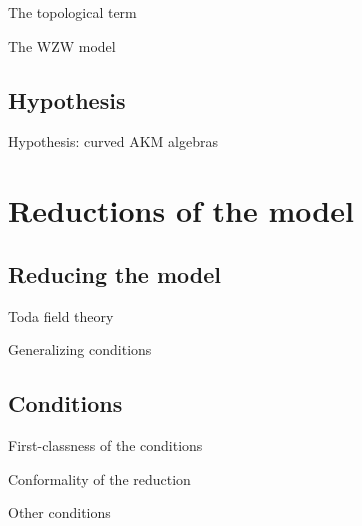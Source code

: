 \documentclass{beamer}
\begin{document}
\begin{frame}{The topological term}
    
\end{frame}

\begin{frame}{The WZW model}
    
\end{frame}


\subsection{Hypothesis}


\begin{frame}{Hypothesis: curved AKM algebras}

\end{frame}

\section{Reductions of the model}
\subsection{Reducing the model}


\begin{frame}{Toda field theory}
    
\end{frame}

\begin{frame}{Generalizing conditions}
    
\end{frame}


\subsection{Conditions}


\begin{frame}{First-classness of the conditions}
    
\end{frame}

\begin{frame}{Conformality of the reduction}
    
\end{frame}

\begin{frame}{Other conditions}
    
\end{frame}
\end{document}
